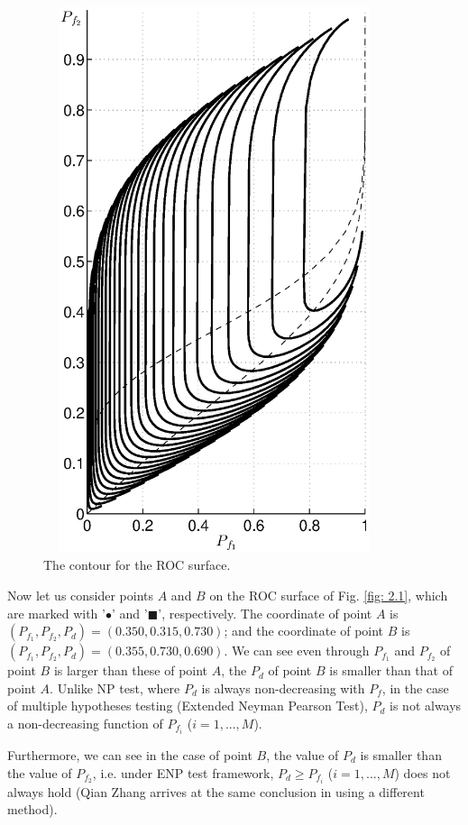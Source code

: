 \begin{figure}[!t]
\centering
\includegraphics[width = 10cm, height=16cm]{2/ex3.eps}
\caption{The contour for the ROC surface.}
\label{fig: 2.3mar9}
\end{figure}

Now let us consider points $A$ and $B$ on the ROC surface of Fig. \ref{fig: 2.1}, which are marked with '$\bullet$' and '$\blacksquare$', respectively.  The coordinate of point $A$ is $(P_{f_1}, P_{f_2}, P_d) = (0.350, 0.315, 0.730)$; and the coordinate of point $B$ is  $(P_{f_1}, P_{f_2}, P_d) = (0.355, 0.730, 0.690)$. We can see even through $P_{f_1}$ and $P_{f_2}$ of point $B$ is larger than these of point $A$, the $P_d$ of point $B$ is  smaller than that of point $A$.  
Unlike NP test, where $P_d$ is always non-decreasing with $P_f$, in the case of multiple hypotheses testing (Extended Neyman Pearson Test), $P_d$ is not always a non-decreasing function of  $P_{f_i}$ ($i=1, ..., M$).

Furthermore, we can see in the case of point $B$, the value of $P_d$ is smaller than the value of $P_{f_2}$, i.e. under ENP test framework, $P_d \geq P_{f_i}$  ($i = 1, ..., M$) does not always hold (Qian Zhang arrives at the same conclusion in  \cite{zhang1999design, zhang2000efficient} using a different method). 

